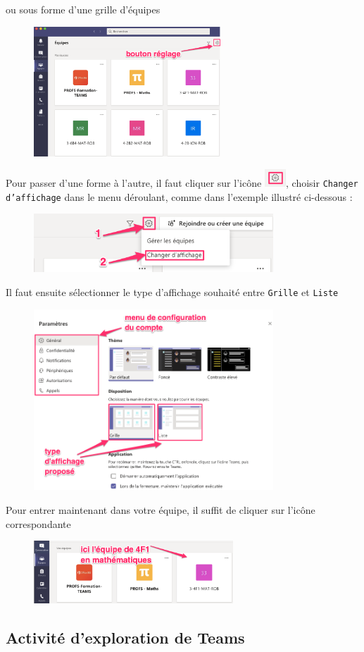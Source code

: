 \newpage
ou sous forme d'une grille d'équipes 

\begin{figure}[H]
\includegraphics[width=7cm]{./images/teams/accueil_grille}
\centering
\end{figure}

Pour passer d'une forme à l'autre, il faut cliquer sur l'icône \includegraphics[width=0.8cm]{./images/teams/bouton_parametres}, choisir \texttt{Changer d'affichage} dans le menu déroulant, comme dans l'exemple illustré ci-dessous :

\begin{figure}[H]
\includegraphics[width=9cm]{./images/teams/changement_liste}
\centering
\end{figure}

Il faut ensuite sélectionner le type d'affichage souhaité entre \texttt{Grille} et \texttt{Liste}

\begin{figure}[H]
\includegraphics[width=9cm]{./images/teams/choix_parametre}
\centering
\end{figure}

 Pour entrer maintenant dans votre équipe, il suffit de cliquer sur l'icône correspondante

\begin{figure}[H]
\includegraphics[width=7.5cm]{./images/teams/entree_classe}
\centering
\end{figure}

\subsection{Activité d'exploration de Teams}

